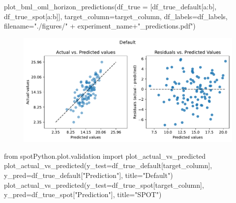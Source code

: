 \documentclass[
  letterpaper,
  DIV=11,
  numbers=noendperiod]{scrreprt}
\newenvironment{Shaded}{\begin{snugshade}}{\end{snugshade}}
\newcommand{\ImportTok}[1]{\textcolor[rgb]{0.00,0.46,0.62}{#1}}
\newcommand{\NormalTok}[1]{\textcolor[rgb]{0.00,0.23,0.31}{#1}}
\newcommand{\OperatorTok}[1]{\textcolor[rgb]{0.37,0.37,0.37}{#1}}
\newcommand{\StringTok}[1]{\textcolor[rgb]{0.13,0.47,0.30}{#1}}
\begin{document}
\begin{Shaded}
\begin{Highlighting}[]
\NormalTok{plot\_bml\_oml\_horizon\_predictions(df\_true }\OperatorTok{=}\NormalTok{ [df\_true\_default[a:b], df\_true\_spot[a:b]], target\_column}\OperatorTok{=}\NormalTok{target\_column,  df\_labels}\OperatorTok{=}\NormalTok{df\_labels, filename}\OperatorTok{=}\StringTok{"./figures/"} \OperatorTok{+}\NormalTok{ experiment\_name}\OperatorTok{+}\StringTok{"\_predictions.pdf"}\NormalTok{)}
\end{Highlighting}
\end{Shaded}

\begin{figure}[H]

{\centering \includegraphics{025_spot_hpt_river_friedman_amfr_files/figure-pdf/cell-35-output-1.pdf}

}

\end{figure}

\begin{Shaded}
\begin{Highlighting}[]
\ImportTok{from}\NormalTok{ spotPython.plot.validation }\ImportTok{import}\NormalTok{ plot\_actual\_vs\_predicted}
\NormalTok{plot\_actual\_vs\_predicted(y\_test}\OperatorTok{=}\NormalTok{df\_true\_default[target\_column], y\_pred}\OperatorTok{=}\NormalTok{df\_true\_default[}\StringTok{"Prediction"}\NormalTok{], title}\OperatorTok{=}\StringTok{"Default"}\NormalTok{)}
\NormalTok{plot\_actual\_vs\_predicted(y\_test}\OperatorTok{=}\NormalTok{df\_true\_spot[target\_column], y\_pred}\OperatorTok{=}\NormalTok{df\_true\_spot[}\StringTok{"Prediction"}\NormalTok{], title}\OperatorTok{=}\StringTok{"SPOT"}\NormalTok{)}
\end{Highlighting}
\end{Shaded}
\end{document}
